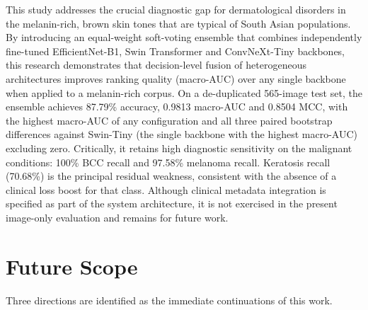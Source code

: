 \documentclass[pdflatex,sn-mathphys-num]{sn-jnl}%
\begin{document}
This study addresses the crucial diagnostic gap for dermatological disorders in the
melanin-rich, brown skin tones that are typical of South Asian populations. By introducing an
equal-weight soft-voting ensemble that combines independently fine-tuned EfficientNet-B1,
Swin Transformer and ConvNeXt-Tiny backbones, this research demonstrates that decision-level
fusion of heterogeneous architectures improves ranking quality (macro-AUC) over any single
backbone when applied to a melanin-rich corpus. On a de-duplicated 565-image test set, the
ensemble achieves 87.79\% accuracy, 0.9813 macro-AUC and 0.8504 MCC, with the highest
macro-AUC of any configuration and all three paired bootstrap differences against Swin-Tiny
(the single backbone with the highest macro-AUC) excluding zero. Critically, it
retains high diagnostic sensitivity on the malignant conditions: 100\% BCC recall and 97.58\%
melanoma recall. Keratosis recall (70.68\%) is the principal residual weakness, consistent
with the absence of a clinical loss boost for that class. Although clinical metadata
integration is specified as part of the system architecture, it is not exercised in the
present image-only evaluation and remains for future work.

\section{Future Scope}\label{sec:future}

Three directions are identified as the immediate continuations of this work.
\end{document}
